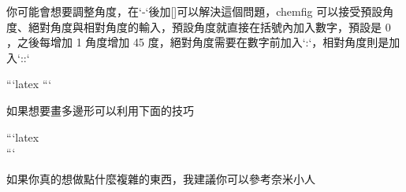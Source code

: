 \begin{markdown}
你可能會想要調整角度，在`-`後加[]可以解決這個問題，chemfig 可以接受預設角度、絕對角度與相對角度的輸入，預設角度就直接在括號內加入數字，預設是 0 ，之後每增加 1 角度增加 45 度，絕對角度需要在數字前加入`:`，相對角度則是加入`::` 

```latex
```

如果想要畫多邊形可以利用下面的技巧

```latex
\\
```

如果你真的想做點什麼複雜的東西，我建議你可以參考奈米小人

\end{markdown}